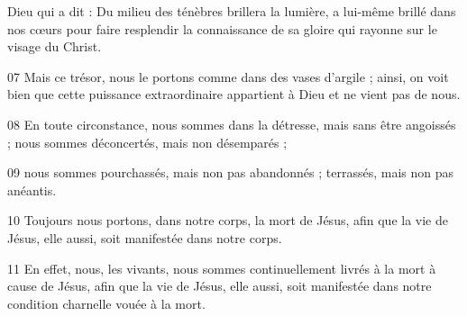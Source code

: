 Dieu qui a dit : Du milieu des ténèbres brillera la lumière, a lui-même brillé dans nos cœurs pour faire resplendir la connaissance de sa gloire qui rayonne sur le visage du Christ.

07 Mais ce trésor, nous le portons comme dans des vases d’argile ; ainsi, on voit bien que cette puissance extraordinaire appartient à Dieu et ne vient pas de nous.

08 En toute circonstance, nous sommes dans la détresse, mais sans être angoissés ; nous sommes déconcertés, mais non désemparés ;

09 nous sommes pourchassés, mais non pas abandonnés ; terrassés, mais non pas anéantis.

10 Toujours nous portons, dans notre corps, la mort de Jésus, afin que la vie de Jésus, elle aussi, soit manifestée dans notre corps.

11 En effet, nous, les vivants, nous sommes continuellement livrés à la mort à cause de Jésus, afin que la vie de Jésus, elle aussi, soit manifestée dans notre condition charnelle vouée à la mort.